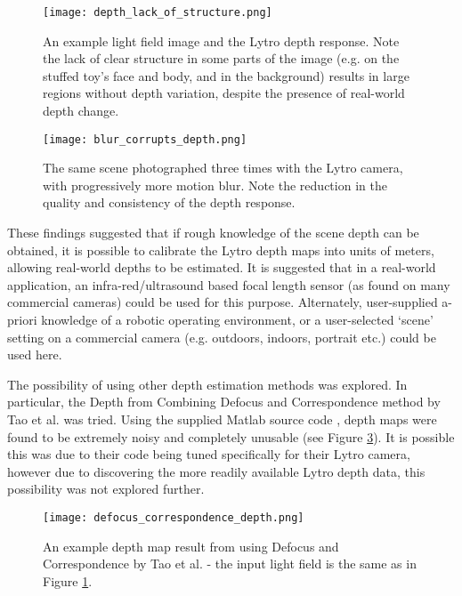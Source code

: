 \begin{figure}
\centering
\texttt{[image: depth\_lack\_of\_structure.png]}
\caption[Lack of Scene Structure Corrupts Lytro Depth Estimation]{An example light field image and the Lytro depth response. Note the lack of clear structure in some parts of the image (e.g. on the stuffed toy's face and body, and in the background) results in large regions without depth variation, despite the presence of real-world depth change.}
\label{fig:depth_lack_of_structure}
\end{figure}

\begin{figure}
\centering
\texttt{[image: blur\_corrupts\_depth.png]}
\caption[Motion Blur Corrupts Lytro Depth Estimation]{The same scene photographed three times with the Lytro camera, with progressively more motion blur. Note the reduction in the quality and consistency of the depth response.}
\label{fig:blur_corrupts_depth}
\end{figure}

These findings suggested that if rough knowledge of the scene depth can be obtained, it is possible to calibrate the Lytro depth maps into units of meters, allowing real-world depths to be estimated.
It is suggested that in a real-world application, an infra-red/ultrasound based focal length sensor (as found on many commercial cameras) could be used for this purpose.
Alternately, user-supplied a-priori knowledge of a robotic operating environment, or a user-selected \enquote*{scene} setting on a commercial camera (e.g. outdoors, indoors, portrait etc.) could be used here.

The possibility of using other depth estimation methods was explored.
In particular, the Depth from Combining Defocus and Correspondence method by Tao et al. \cite{tao2013depth} was tried.
Using the supplied Matlab source code \cite{tao2013depthwebsite}, depth maps were found to be extremely noisy and completely unusable (see Figure \ref{fig:defocus_correspondence_depth}).
It is possible this was due to their code being tuned specifically for their Lytro camera, however due to discovering the more readily available Lytro depth data, this possibility was not explored further.


\begin{figure}[h]
\centering
\texttt{[image: defocus\_correspondence\_depth.png]}
\caption[Depth Map from combining Defocus and Correspondence]{An example depth map result from using Defocus and Correspondence by Tao et al. \cite{tao2013depthwebsite} - the input light field is the same as in Figure \ref{fig:depth_lack_of_structure}.}
\label{fig:defocus_correspondence_depth}
\end{figure}
